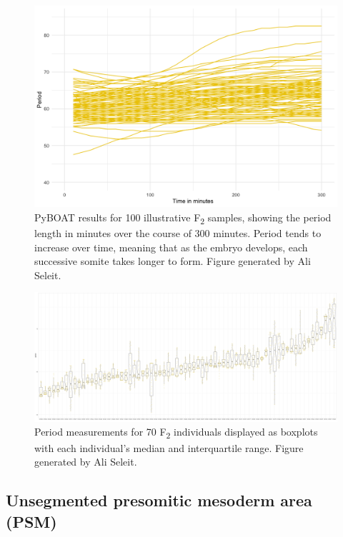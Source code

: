 \documentclass[
]{book}
\begin{document}
\begin{figure}
\includegraphics[width=1\linewidth]{figs/somites/ali_period_lines_100fish300mins} \caption{PyBOAT results for 100 illustrative F\textsubscript{2} samples, showing the period length in minutes over the course of 300 minutes. Period tends to increase over time, meaning that as the embryo develops, each successive somite takes longer to form. Figure generated by Ali Seleit.}\label{fig:ali-somite-period-lines}
\end{figure}



\begin{figure}
\includegraphics[width=1\linewidth]{figs/somites/ali_F2_mean_period} \caption{Period measurements for 70 F\textsubscript{2} individuals displayed as boxplots with each individual's median and interquartile range. Figure generated by Ali Seleit.}\label{fig:ali-somite-period-box}
\end{figure}

\clearpage

\hypertarget{unsegmented-presomitic-mesoderm-area-psm}{%
\subsection{Unsegmented presomitic mesoderm area (PSM)}\label{unsegmented-presomitic-mesoderm-area-psm}}
\end{document}
